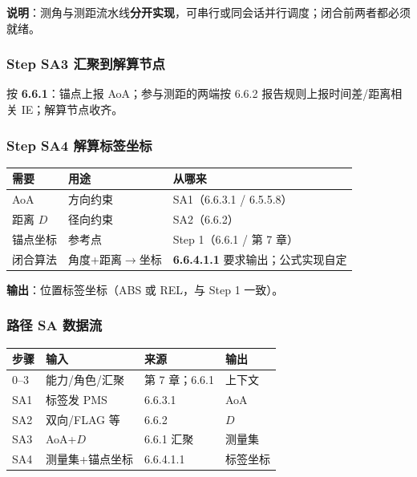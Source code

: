 \documentclass[11pt,a4paper]{ctexart}
\begin{document}
\textbf{说明}：测角与测距流水线\textbf{分开实现}，可串行或同会话并行调度；闭合前两者都必须就绪。

\subsubsection{Step SA3 汇聚到解算节点}

按 \textbf{6.6.1}：锚点上报 AoA；参与测距的两端按 6.6.2 报告规则上报时间差/距离相关 IE；解算节点收齐。

\subsubsection{Step SA4 解算标签坐标}

\begin{table}[h]
\centering
\small
\begin{tabular}{L{3.4cm}L{4.8cm}L{4.8cm}}
\toprule
\textbf{需要} & \textbf{用途} & \textbf{从哪来} \\
\midrule
AoA & 方向约束 & SA1（6.6.3.1 / 6.5.5.8） \\
距离 $D$ & 径向约束 & SA2（6.6.2） \\
锚点坐标 & 参考点 & Step 1（6.6.1 / 第 7 章） \\
闭合算法 & 角度+距离$\rightarrow$坐标 & \textbf{6.6.4.1.1} 要求输出；公式实现自定 \\
\bottomrule
\end{tabular}
\end{table}

\textbf{输出}：位置标签坐标（ABS 或 REL，与 Step 1 一致）。

\subsubsection{路径 SA 数据流}

\begin{table}[h]
\centering
\small
\begin{tabular}{llll}
\toprule
\textbf{步骤} & \textbf{输入} & \textbf{来源} & \textbf{输出} \\
\midrule
0--3 & 能力/角色/汇聚 & 第 7 章；6.6.1 & 上下文 \\
SA1 & 标签发 PMS & 6.6.3.1 & AoA \\
SA2 & 双向/FLAG 等 & 6.6.2 & $D$ \\
SA3 & AoA+$D$ & 6.6.1 汇聚 & 测量集 \\
SA4 & 测量集+锚点坐标 & 6.6.4.1.1 & 标签坐标 \\
\bottomrule
\end{tabular}
\end{table}
\end{document}
